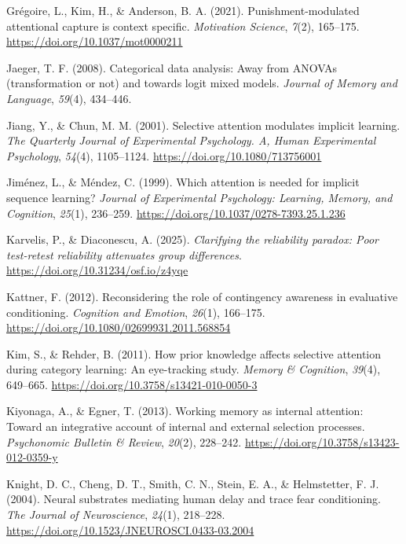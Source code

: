 \documentclass[
  man,
  floatsintext,
  longtable,
  nolmodern,
  notxfonts,
  notimes,
  mask,
  colorlinks=true,linkcolor=blue,citecolor=blue,urlcolor=blue]{apa7}
\newlength{\cslhangindent}
\newenvironment{CSLReferences}[2] %
 {\begin{list}{}{%
  \setlength{\itemindent}{0pt}
  \setlength{\leftmargin}{0pt}
  \setlength{\parsep}{0pt}
  \ifodd #1
   \setlength{\leftmargin}{\cslhangindent}
   \setlength{\itemindent}{-1\cslhangindent}
  \fi
  \setlength{\itemsep}{#2\baselineskip}}}
 {\end{list}}
\begin{document}
\begin{CSLReferences}{1}{0}
Grégoire, L., Kim, H., \& Anderson, B. A. (2021). Punishment-modulated
attentional capture is context specific. \emph{Motivation Science},
\emph{7}(2), 165--175. \url{https://doi.org/10.1037/mot0000211}

Jaeger, T. F. (2008). Categorical data analysis: Away from ANOVAs
(transformation or not) and towards logit mixed models. \emph{Journal of
Memory and Language}, \emph{59}(4), 434--446.

Jiang, Y., \& Chun, M. M. (2001). Selective attention modulates implicit
learning. \emph{The Quarterly Journal of Experimental Psychology. A,
Human Experimental Psychology}, \emph{54}(4), 1105--1124.
\url{https://doi.org/10.1080/713756001}

Jiménez, L., \& Méndez, C. (1999). Which attention is needed for
implicit sequence learning? \emph{Journal of Experimental Psychology:
Learning, Memory, and Cognition}, \emph{25}(1), 236--259.
\url{https://doi.org/10.1037/0278-7393.25.1.236}

Karvelis, P., \& Diaconescu, A. (2025). \emph{Clarifying the reliability
paradox: Poor test-retest reliability attenuates group differences}.
\url{https://doi.org/10.31234/osf.io/z4yqe}

Kattner, F. (2012). Reconsidering the role of contingency awareness in
evaluative conditioning. \emph{Cognition and Emotion}, \emph{26}(1),
166--175. \url{https://doi.org/10.1080/02699931.2011.568854}

Kim, S., \& Rehder, B. (2011). How prior knowledge affects selective
attention during category learning: An eye-tracking study. \emph{Memory
\& Cognition}, \emph{39}(4), 649--665.
\url{https://doi.org/10.3758/s13421-010-0050-3}

Kiyonaga, A., \& Egner, T. (2013). Working memory as internal attention:
Toward an integrative account of internal and external selection
processes. \emph{Psychonomic Bulletin \& Review}, \emph{20}(2),
228--242. \url{https://doi.org/10.3758/s13423-012-0359-y}

Knight, D. C., Cheng, D. T., Smith, C. N., Stein, E. A., \& Helmstetter,
F. J. (2004). Neural substrates mediating human delay and trace fear
conditioning. \emph{The Journal of Neuroscience}, \emph{24}(1),
218--228. \url{https://doi.org/10.1523/JNEUROSCI.0433-03.2004}


\end{CSLReferences}
\end{document}
